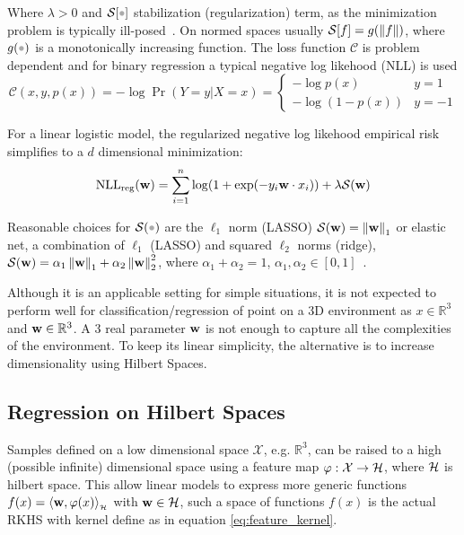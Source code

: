 Where $\lambda>0$ and $\mathcal{S}[\parm]$ stabilization (regularization) term,
as the minimization problem is typically
ill-posed~\cite{jaakkola1999probabilistic}. On normed spaces usually
$\mathcal{S}[f]=g(\left\lVert f\right\rVert)$, where $g(\parm)$ is a monotonically increasing
function.
The loss function $\mathscr{C}$ is problem dependent and for binary regression a
typical negative log likehood (NLL) is used
\begin{equation}
\mathscr{C}(x,y,p(x)) = - \log \Pr(Y=y|X=x) = 
\begin{cases} 
      - \log p(x) & y=1 \\
      - \log (1-p(x)) & y=-1
   \end{cases}
\end{equation}

For a linear logistic model, the regularized negative log likehood empirical
risk simplifies to a $d$ dimensional minimization:
\begin{equation}
\label{eq:classicnll}
\text{NLL}_{\text{reg}}(\mathrm{\mathbf{w}}) =  \sum_{i=1}^n \log(1+\exp(-y_i
\mathrm{\mathbf{w}}\cdot x_i)) +\lambda\mathcal{S}(\mathrm{\mathbf{w}})
\end{equation}


Reasonable choices for $\mathcal{S}(\parm)$
are the $\ell_1$ norm (LASSO)
$\mathcal{S}(\mathrm{\mathbf{w}})=\left\lVert\mathrm{\mathbf{w}}\right\rVert_1$
or elastic net, a combination of $\ell_1$ (LASSO) and
squared $\ell_2$ norms (ridge),
$\mathcal{S}(\mathrm{\mathbf{w}})=\alpha_1\left\lVert\mathrm{\mathbf{w}}\right\rVert_1
+\alpha_2\left\lVert\mathrm{\mathbf{w}}\right\rVert_2^2$, where
$\alpha_1+\alpha_2=1$, $\alpha_1,\alpha_2\in[0,1]$~\cite{hastie2015statistical}.


Although it is an applicable setting for simple situations, it is not expected
to perform well for classification/regression of point on a 3D environment as
$x\in\mathbb{R}^3$ and $\mathrm{\mathbf{w}}\in\mathbb{R}^3$. A 3 real parameter
$\mathrm{\mathbf{w}}$ is not enough to capture all the complexities of the environment. To
keep its linear simplicity, the alternative is to increase dimensionality using
Hilbert Spaces.

\subsection{Regression on Hilbert Spaces}
\label{ss:reg_hs}
Samples defined on a low dimensional space $\mathcal{X}$, e.g. $\mathbb{R}^3$,
can be raised to a high (possible infinite) dimensional space using a feature
map $\varphi:\mathcal{X}\to\mathcal{H}$, where $\mathcal{H}$ is hilbert space. This allow
linear models to express more generic functions $f(x) =
\langle \mathrm{\mathbf{w}},\varphi(x)\rangle_{_{\mathcal{H}}}$ with $\mathrm{\mathbf{w}}\in\mathcal{H}$, such a space of functions
$f(x)$ is the actual RKHS with kernel define as in equation
\ref{eq:feature_kernel}.

